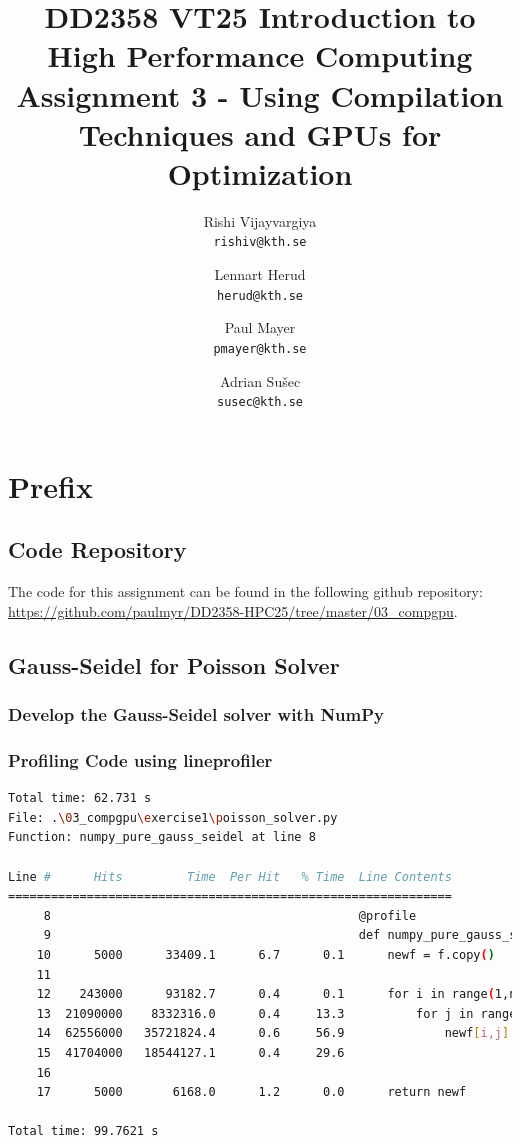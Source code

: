 \documentclass[a4paper,12pt]{article}
\title{
  \normalsize{DD2358 VT25 Introduction to}\\
  \normalsize{High Performance Computing}\\
  \large{Assignment 3 - Using Compilation Techniques and GPUs for Optimization}\\
}
\author{
  \small Rishi Vijayvargiya\\[-0.75ex]
  \scriptsize\texttt{rishiv@kth.se}
  \and
  \small Lennart Herud\\[-0.75ex]
  \scriptsize\texttt{herud@kth.se}
  \and
  \small Paul Mayer\\[-0.75ex]
  \scriptsize\texttt{pmayer@kth.se}
  \and
  \small Adrian Sušec\\[-0.75ex]
  \scriptsize\texttt{susec@kth.se}
}
\date{}
\begin{document}
\maketitle
\thispagestyle{firstpagestyle}

\listoftodos

\vspace{1em}

%
\section*{Prefix}

%

\subsection*{Code Repository}
The code for this assignment can be found in the following github repository: \url{https://github.com/paulmyr/DD2358-HPC25/tree/master/03_compgpu}.

\subsection{Gauss-Seidel for Poisson Solver}
\subsubsection{Develop the Gauss-Seidel solver with NumPy}
\subsubsection{Profiling Code using lineprofiler}
\begin{lstlisting}[language=bash,basicstyle=\tiny\ttfamily]
Total time: 62.731 s
File: .\03_compgpu\exercise1\poisson_solver.py
Function: numpy_pure_gauss_seidel at line 8

Line #      Hits         Time  Per Hit   % Time  Line Contents
==============================================================
     8                                           @profile
     9                                           def numpy_pure_gauss_seidel(f):
    10      5000      33409.1      6.7      0.1      newf = f.copy()
    11
    12    243000      93182.7      0.4      0.1      for i in range(1,newf.shape[0]-1):
    13  21090000    8332316.0      0.4     13.3          for j in range(1,newf.shape[1]-1):
    14  62556000   35721824.4      0.6     56.9              newf[i,j] = 0.25 * (newf[i,j+1] + newf[i,j-1] +
    15  41704000   18544127.1      0.4     29.6                                  newf[i+1,j] + newf[i-1,j])
    16
    17      5000       6168.0      1.2      0.0      return newf

Total time: 99.7621 s
\end{lstlisting}
\end{document}
